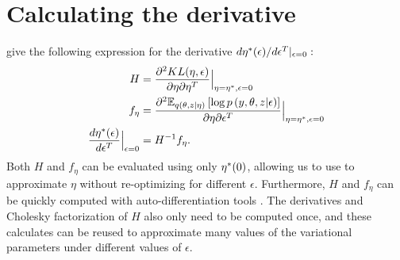 

\section{Calculating the derivative}\label{app:sensitivity}

\citet[Theorem 2]{giordano:2017:covariances} give
the following expression for
the derivative $d \eta^{*}(\epsilon)/ d\epsilon^T \vert_{\epsilon = 0}:$
%
\begin{align}
H &= \frac{\partial^2 KL(\eta, \epsilon)}{\partial \eta \partial \eta^T}
    \Big\rvert_{\eta = \eta^{*}, \epsilon = 0} \nonumber \\
f_\eta &= \frac{\partial^2
    \mathbb{E}_{q\left(\theta, z \vert \eta\right)}
        \left[ \log p\left(y, \theta, z \vert \epsilon \right)\right]
    } {\partial \eta \partial \epsilon^T}
    \Big\rvert_{\eta = \eta^{*}, \epsilon = 0}  \nonumber  \\
\frac{d \eta^{*}(\epsilon)}{d\epsilon^T}\Big|_{\epsilon=0} &=
    H^{-1} f_\eta. \label{eq:vb_sensitivty}
\end{align}
%
Both $H$ and $f_\eta$ can be evaluated using only $\eta^{*}(0)$, allowing us to
use  to approximate $\eta$ without re-optimizing
 for different $\epsilon$. Furthermore, $H$ and
$f_\eta$ can be quickly computed with auto-differentiation tools
\citep{maclaurin:2015:autograd}. The derivatives and Cholesky factorization of
$H$ also only need to be computed once, and these calculates can be reused to
approximate many values of the variational parameters under different
values of $\epsilon$.

